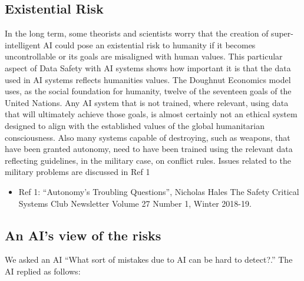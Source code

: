 \subsection{Existential Risk}
In the long term, some theorists and scientists worry that the creation of super-intelligent AI could pose an existential risk to humanity if it becomes uncontrollable or its goals are misaligned with human values. This particular aspect of Data Safety with AI systems shows how important it is that the data used in AI systems reflects humanities values. The Doughnut Economics model uses, as the social foundation for humanity, twelve of the seventeen goals of the United Nations. Any AI system that is not trained, where relevant, using data that will ultimately achieve those goals, is almost certainly not an ethical system designed to align with the established values of the global humanitarian consciousness. Also many systems capable of destroying, such as  weapons, that have been granted autonomy, need to have been trained using the relevant data reflecting guidelines, in the military case, on conflict rules. Issues related to the military problems are discussed in Ref 1
\begin{itemize}
\item Ref 1:  “Autonomy’s Troubling Questions”, Nicholas Hales The Safety Critical Systems Club Newsletter Volume 27 Number 1, Winter 2018-19.
\end{itemize}

\subsection{An AI's view of the risks}
We asked an AI ``What sort of mistakes due to AI can be hard to detect?.'' The AI replied as follows:

